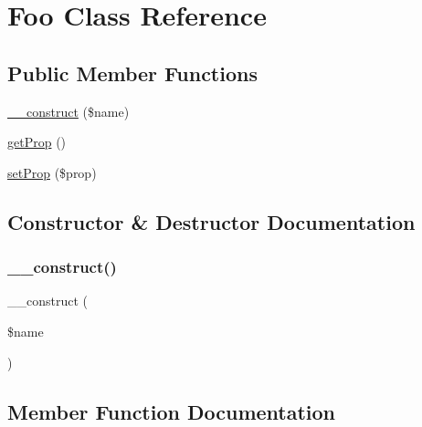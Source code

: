 \hypertarget{class_deep_copy_1_1f003_1_1_foo}{}\section{Foo Class Reference}
\label{class_deep_copy_1_1f003_1_1_foo}
\subsection*{Public Member Functions}
\begin{DoxyCompactItemize}
\item 
\mbox{\hyperlink{class_deep_copy_1_1f003_1_1_foo_a4717bbfc70a40a57ee741ed70766c309}{\+\_\+\+\_\+construct}} (\$name)
\item 
\mbox{\hyperlink{class_deep_copy_1_1f003_1_1_foo_a030e2e0e2b1bd02cb2d25ad66f36738c}{get\+Prop}} ()
\item 
\mbox{\hyperlink{class_deep_copy_1_1f003_1_1_foo_ad786bae4ca9ec5a5e51b6b95a1700343}{set\+Prop}} (\$prop)
\end{DoxyCompactItemize}


\subsection{Constructor \& Destructor Documentation}
\mbox{\label{class_deep_copy_1_1f003_1_1_foo_a4717bbfc70a40a57ee741ed70766c309}} 
\subsubsection{\texorpdfstring{\+\_\+\+\_\+construct()}{\_\_construct()}}
{\footnotesize\ttfamily \+\_\+\+\_\+construct (\begin{DoxyParamCaption}\item[{}]{\$name }\end{DoxyParamCaption})}



\subsection{Member Function Documentation}
\mbox{\label{class_deep_copy_1_1f003_1_1_foo_a030e2e0e2b1bd02cb2d25ad66f36738c}} 
